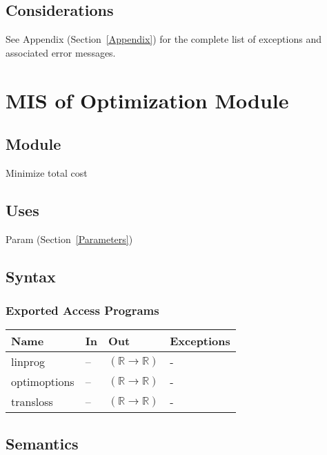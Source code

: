 \documentclass[12pt, titlepage]{article}
\begin{document}
 
 \subsection{Considerations}

See Appendix (Section~\ref{Appendix}) for the complete list of exceptions and
 associated error messages.

\newpage
\section{MIS of Optimization Module} \label{Temperature}

\subsection{Module}

Minimize total cost

\subsection{Uses}

Param (Section~\ref{Parameters})

\subsection{Syntax}

\subsubsection{Exported Access Programs}

\begin{center}
\begin{tabular}{p{3.5cm} p{1cm} p{7cm} p{2cm}}
\hline
\textbf{Name} & \textbf{In} & \textbf{Out} & \textbf{Exceptions} \\
\hline
linprog & -- & $(\mathbb{R} \rightarrow \mathbb{R})$ & - \\
\hline
optimoptions& -- &  $(\mathbb{R}\rightarrow \mathbb{R})$ & - \\
\hline
transloss& -- &  $(\mathbb{R}\rightarrow \mathbb{R})$ & - \\
\hline
\end{tabular}
\end{center}

\subsection{Semantics}
\end{document}
